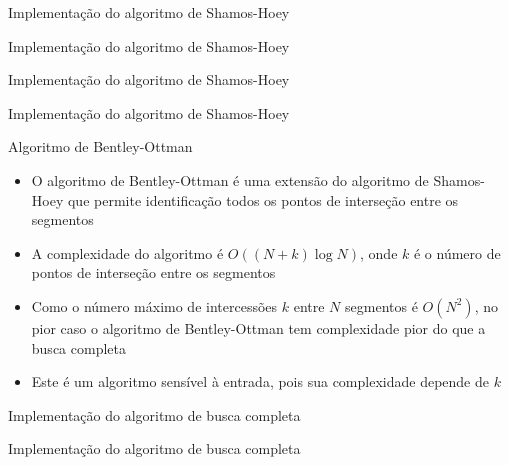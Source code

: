 \begin{frame}[fragile]{Implementação do algoritmo de Shamos-Hoey}
\end{frame}

\begin{frame}[fragile]{Implementação do algoritmo de Shamos-Hoey}
\end{frame}

\begin{frame}[fragile]{Implementação do algoritmo de Shamos-Hoey}
\end{frame}

\begin{frame}[fragile]{Implementação do algoritmo de Shamos-Hoey}
\end{frame}

\begin{frame}[fragile]{Algoritmo de Bentley-Ottman}

    \begin{itemize}
        \item O algoritmo de Bentley-Ottman é uma extensão do algoritmo de Shamos-Hoey que
            permite identificação todos os pontos de interseção entre os segmentos

        \item A complexidade do algoritmo é $O((N + k)\log N)$, onde $k$ é o número de 
        pontos de interseção entre os segmentos

        \item Como o número máximo de intercessões $k$ entre $N$ segmentos é $O(N^2)$,
            no pior caso o algoritmo de Bentley-Ottman tem complexidade pior do que a
            busca completa

        \item Este é um algoritmo sensível à entrada, pois sua complexidade depende de $k$

    \end{itemize}

\end{frame}

\begin{frame}[fragile]{Implementação do algoritmo de busca completa}
\end{frame}

\begin{frame}[fragile]{Implementação do algoritmo de busca completa}
\end{frame}

